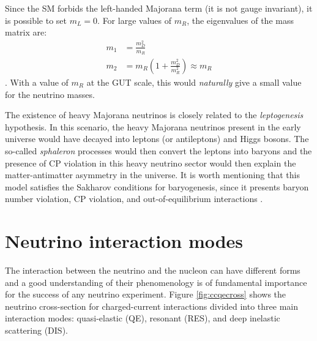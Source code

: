 Since the SM forbids the left-handed Majorana term (it is not gauge invariant), it is possible to set $m_L=0$. For large values of $m_R$, the eigenvalues of the mass matrix are:
\begin{align}
    m_1 & = \frac{m_D^2}{m_R} \\
    m_2 & = m_R \left(1+\frac{m_D^2}{m_R^2}\right) \approx m_R
\end{align}. With a value of $m_R$ at the GUT scale, this would \emph{naturally} give a small value for the neutrino masses. 

The existence of heavy Majorana neutrinos is closely related to the \emph{leptogenesis} hypothesis. In this scenario, the heavy Majorana neutrinos present in the early universe would have decayed into leptons (or antileptons) and Higgs bosons. The so-called \emph{sphaleron} processes would then convert the leptons into baryons and the presence of CP violation in this heavy neutrino sector would then explain the matter-antimatter asymmetry in the universe. It is worth mentioning that this model satisfies the Sakharov conditions \cite{Sakharov:1967dj} for baryogenesis, since it presents baryon number violation, CP violation, and out-of-equilibrium interactions \cite{DiBari:2012fz}.


\section{Neutrino interaction modes}\label{sec:modes}
The interaction between the neutrino and the nucleon can have different forms and a good understanding of their phenomenology is of fundamental importance for the success of any neutrino experiment.
Figure \ref{fig:ccqecross} shows the neutrino cross-section for charged-current interactions divided into three main interaction modes: quasi-elastic (QE), resonant (RES), and deep inelastic scattering (DIS). 

